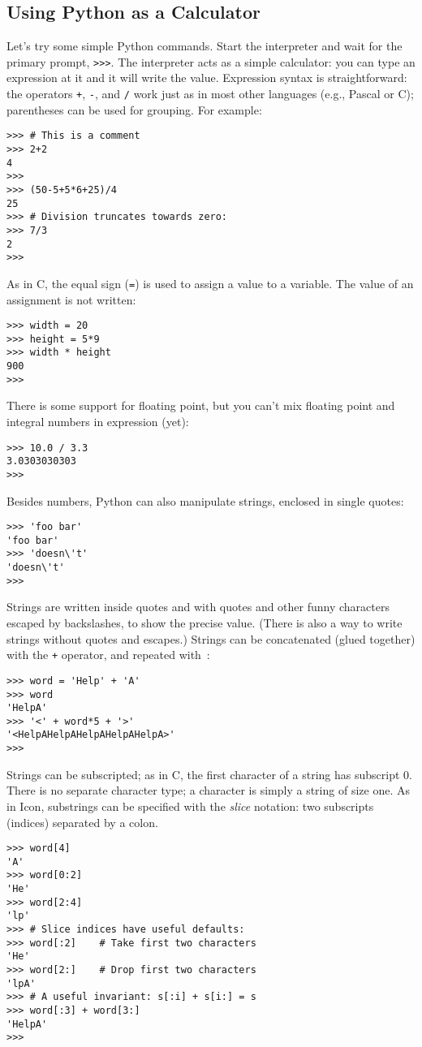 \subsection{Using Python as a Calculator}

Let's try some simple Python commands.
Start the interpreter and wait for the primary prompt,
{\tt >>>}.
The interpreter acts as a simple calculator: you can type an expression
at it and it will write the value.
Expression syntax is straightforward: the operators
{\tt +},
{\tt -},
{\tt *}
and
{\tt /}
work just as in most other languages (e.g., Pascal or C); parentheses
can be used for grouping.
For example:
\bcode\begin{verbatim}
>>> # This is a comment
>>> 2+2
4
>>> 
>>> (50-5+5*6+25)/4
25
>>> # Division truncates towards zero:
>>> 7/3
2
>>> 
\end{verbatim}\ecode
As in C, the equal sign ({\tt =}) is used to assign a value to a variable.
The value of an assignment is not written:
\bcode\begin{verbatim}
>>> width = 20
>>> height = 5*9
>>> width * height
900
>>> 
\end{verbatim}\ecode
There is some support for floating point, but you can't mix floating
point and integral numbers in expression (yet):
\bcode\begin{verbatim}
>>> 10.0 / 3.3
3.0303030303
>>> 
\end{verbatim}\ecode
Besides numbers, Python can also manipulate strings, enclosed in single
quotes:
\bcode\begin{verbatim}
>>> 'foo bar'
'foo bar'
>>> 'doesn\'t'
'doesn\'t'
>>> 
\end{verbatim}\ecode
Strings are written inside quotes and with quotes and other funny
characters escaped by backslashes, to show the precise value.
(There is also a way to write strings without quotes and escapes.)
Strings can be concatenated (glued together) with the
{\tt +}
operator, and repeated with~{\tt *}:
\bcode\begin{verbatim}
>>> word = 'Help' + 'A'
>>> word
'HelpA'
>>> '<' + word*5 + '>'
'<HelpAHelpAHelpAHelpAHelpA>'
>>> 
\end{verbatim}\ecode
Strings can be subscripted; as in C, the first character of a string has
subscript 0.
There is no separate character type; a character is simply a string of
size one.
As in Icon, substrings can be specified with the
{\em slice}
notation: two subscripts (indices) separated by a colon.
\bcode\begin{verbatim}
>>> word[4]
'A'
>>> word[0:2]
'He'
>>> word[2:4]
'lp'
>>> # Slice indices have useful defaults:
>>> word[:2]    # Take first two characters
'He'
>>> word[2:]    # Drop first two characters
'lpA'
>>> # A useful invariant: s[:i] + s[i:] = s
>>> word[:3] + word[3:]
'HelpA'
>>> 
\end{verbatim}\ecode

